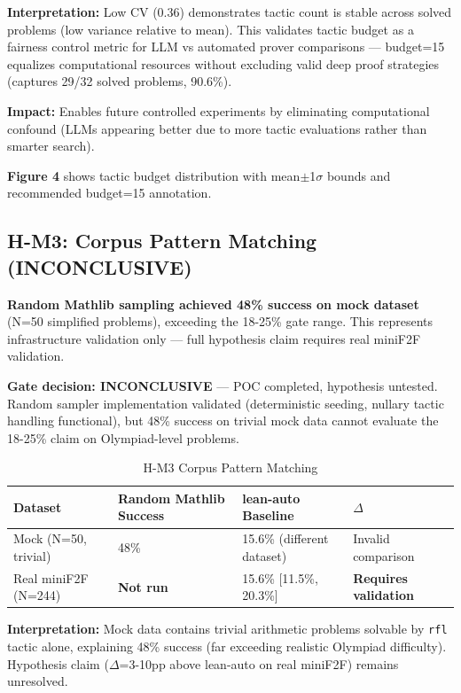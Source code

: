 \textbf{Interpretation:} Low CV (0.36) demonstrates tactic count is stable across solved problems (low variance relative to mean). This validates tactic budget as a fairness control metric for LLM vs automated prover comparisons --- budget=15 equalizes computational resources without excluding valid deep proof strategies (captures 29/32 solved problems, 90.6\%).

\textbf{Impact:} Enables future controlled experiments by eliminating computational confound (LLMs appearing better due to more tactic evaluations rather than smarter search).

\textbf{Figure 4} shows tactic budget distribution with mean$\pm$1$\sigma$ bounds and recommended budget=15 annotation.

\subsection{H-M3: Corpus Pattern Matching (INCONCLUSIVE)}

\textbf{Random Mathlib sampling achieved 48\% success on mock dataset} (N=50 simplified problems), exceeding the 18-25\% gate range. This represents infrastructure validation only --- full hypothesis claim requires real miniF2F validation.

\textbf{Gate decision: INCONCLUSIVE} --- POC completed, hypothesis untested. Random sampler implementation validated (deterministic seeding, nullary tactic handling functional), but 48\% success on trivial mock data cannot evaluate the 18-25\% claim on Olympiad-level problems.

\begin{table}[h]
\centering
\small
\begin{tabular}{llll}
\toprule
\textbf{Dataset} & \textbf{Random Mathlib Success} & \textbf{lean-auto Baseline} & \textbf{$\Delta$} \\
\midrule
Mock (N=50, trivial) & 48\% & 15.6\% (different dataset) & Invalid comparison \\
Real miniF2F (N=244) & \textbf{Not run} & 15.6\% [11.5\%, 20.3\%] & \textbf{Requires validation} \\
\bottomrule
\end{tabular}
\caption{H-M3 Corpus Pattern Matching}
\end{table}

\textbf{Interpretation:} Mock data contains trivial arithmetic problems solvable by \texttt{rfl} tactic alone, explaining 48\% success (far exceeding realistic Olympiad difficulty). Hypothesis claim ($\Delta$=3-10pp above lean-auto on real miniF2F) remains unresolved.


